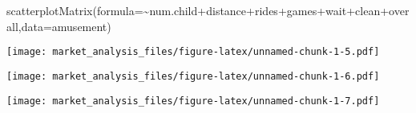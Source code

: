 \documentclass[
]{article}
\newenvironment{Shaded}{\begin{snugshade}}{\end{snugshade}}
\newcommand{\AttributeTok}[1]{\textcolor[rgb]{0.77,0.63,0.00}{#1}}
\newcommand{\CommentTok}[1]{\textcolor[rgb]{0.56,0.35,0.01}{\textit{#1}}}
\newcommand{\ConstantTok}[1]{\textcolor[rgb]{0.00,0.00,0.00}{#1}}
\newcommand{\FunctionTok}[1]{\textcolor[rgb]{0.00,0.00,0.00}{#1}}
\newcommand{\NormalTok}[1]{#1}
\newcommand{\OtherTok}[1]{\textcolor[rgb]{0.56,0.35,0.01}{#1}}
\newcommand{\SpecialCharTok}[1]{\textcolor[rgb]{0.00,0.00,0.00}{#1}}
\begin{document}
\begin{Shaded}
\begin{Highlighting}[]
\FunctionTok{scatterplotMatrix}\NormalTok{(}\AttributeTok{formula=}\SpecialCharTok{\textasciitilde{}}\NormalTok{num.child}\SpecialCharTok{+}\NormalTok{distance}\SpecialCharTok{+}\NormalTok{rides}\SpecialCharTok{+}\NormalTok{games}\SpecialCharTok{+}\NormalTok{wait}\SpecialCharTok{+}\NormalTok{clean}\SpecialCharTok{+}\NormalTok{overall,}\AttributeTok{data=}\NormalTok{amusement)}
\end{Highlighting}
\end{Shaded}

\texttt{[image: market\_analysis\_files/figure-latex/unnamed-chunk-1-5.pdf]}

\begin{Shaded}
\end{Shaded}

\texttt{[image: market\_analysis\_files/figure-latex/unnamed-chunk-1-6.pdf]}

\begin{Shaded}
\end{Shaded}

\texttt{[image: market\_analysis\_files/figure-latex/unnamed-chunk-1-7.pdf]}
\end{document}
